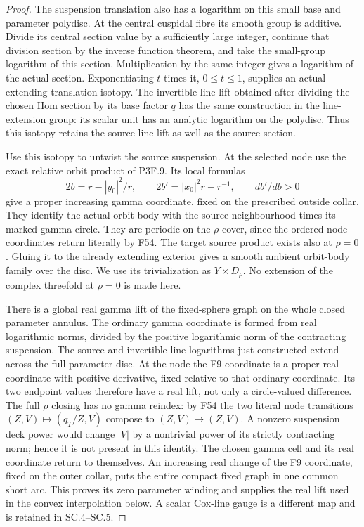 \begin{proof}
The suspension translation also has a logarithm on this small base and
parameter polydisc. At the central cuspidal fibre its smooth group is
additive. Divide its central section value by a sufficiently large
integer, continue that division section by the inverse function theorem,
and take the small-group logarithm of this section. Multiplication by the
same integer gives a logarithm of the actual section. Exponentiating
\(t\) times it, \(0\leq t\leq1\), supplies an actual extending
translation isotopy. The invertible line lift obtained after dividing
the chosen Hom section by its base factor \(q\) has the same construction
in the line-extension group: its scalar unit has an analytic logarithm
on the polydisc. Thus this isotopy retains the source-line lift as well
as the source section.

Use this isotopy to untwist the source suspension. At the selected node
use the exact relative orbit product of P3F.9. Its local formulas
\[
 2b=r-|y_0|^2/r,\qquad
 2b'=|x_0|^2r-r^{-1},\qquad db'/db>0
\]
give a proper increasing gamma coordinate, fixed on the prescribed
outside collar. They identify the actual orbit body with the source
neighbourhood times its marked gamma circle. They are periodic on the
\(\rho\)-cover, since the ordered node coordinates return literally
by F54. The target source product exists also at \(\rho=0\). Gluing it
to the already extending exterior gives a smooth ambient orbit-body
family over the disc. We use its trivialization as \(Y\times D_\rho\).
No extension of the complex threefold at \(\rho=0\) is made here.

There is a global real gamma lift of the fixed-sphere graph on the whole
closed parameter annulus. The ordinary gamma coordinate is formed from
real logarithmic norms, divided by the positive logarithmic norm of the
contracting suspension. The source and invertible-line logarithms just
constructed extend across the full parameter disc. At the node the F9
coordinate is a proper real coordinate with positive derivative, fixed
relative to that ordinary coordinate. Its two endpoint values therefore
have a real lift, not only a circle-valued difference. The full \(\rho\)
closing has no gamma reindex: by F54 the two literal node transitions
\((Z,V)\mapsto(q_T/Z,V)\) compose to \((Z,V)\mapsto(Z,V)\).
A nonzero suspension deck power would change \(|V|\) by a nontrivial
power of its strictly contracting norm; hence it is not present in this
identity. The chosen gamma cell and its real coordinate return to
themselves. An increasing real change of the F9 coordinate, fixed on the
outer collar, puts the entire compact fixed graph in one common short
arc. This proves its zero parameter winding and supplies the real lift
used in the convex interpolation below. A scalar Cox-line gauge is a
different map and is retained in SC.4--SC.5.


\end{proof}
